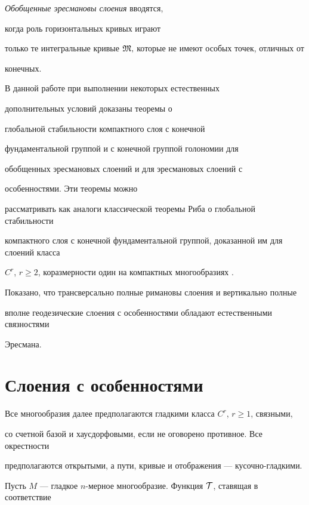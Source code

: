{\it Обобщенные эресмановы слоения} вводятся,


когда роль горизонтальных кривых играют


только те интегральные кривые $\frak M,$ которые не имеют особых точек, отличных от


конечных.





В данной работе при выполнении некоторых естественных 


дополнительных условий доказаны теоремы о


глобальной стабильности компактного слоя с конечной 


фундаментальной группой и с конечной группой голономии для


обобщенных эресмановых слоений и для эресмановых слоений с 


особенностями. Эти теоремы можно


рассматривать как аналоги классической теоремы Риба о глобальной стабильности


компактного слоя с конечной фундаментальной группой, доказанной им для слоений класса


$C^r$, $r\ge 2$, коразмерности один на компактных многообразиях \cite{T}.


Показано, что трансверсально полные римановы слоения и вертикально полные


вполне геодезические слоения с особенностями обладают естественными связностями


Эресмана.








\section{Слоения с особенностями}





Все многообразия далее предполагаются гладкими класса $C^r$, $r\ge 1$, связными,


со счетной базой и хаусдорфовыми, если не оговорено противное. Все окрестности


предполагаются открытыми, а пути, кривые и отображения --- кусочно-гладкими.





Пусть $M$ --- гладкое $n$-мерное многообразие. Функция $\cal T$, ставящая в соответствие


